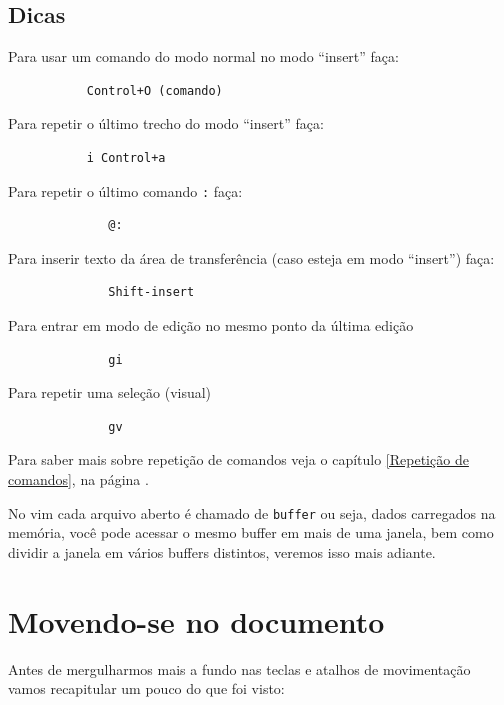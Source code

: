 \documentclass[10pt,a4paper,openany]{book}
\begin{document}
\section{Dicas}
\label{Dicas}
Para usar um comando do modo normal no modo ``insert'' faça:

\begin{verbatim}
		   Control+O (comando)
\end{verbatim}

Para repetir o último trecho do modo ``insert'' faça:

\begin{verbatim}
		   i Control+a
\end{verbatim}

Para repetir o último comando \verb+:+ faça:

\begin{verbatim}
			  @:
\end{verbatim}

Para inserir texto da área de transferência (caso esteja em modo ``insert'') faça:

\begin{verbatim}
			  Shift-insert
\end{verbatim}

Para entrar em modo de edição no mesmo ponto da última edição

\begin{verbatim}
			  gi
\end{verbatim}

Para repetir uma seleção (visual)

\begin{verbatim}
			  gv
\end{verbatim}

Para saber mais sobre repetição de comandos veja o capítulo \ref{Repetição de comandos},
na página \pageref{Repetição de comandos}.

No vim cada arquivo aberto é chamado de \verb|buffer| ou seja, dados
carregados na memória, você pode acessar o mesmo buffer em mais de uma
janela, bem como dividir a janela em vários buffers distintos, veremos
isso mais adiante.

\chapter{Movendo-se no documento}\label{cha:Movendo-se no documento}

Antes de mergulharmos mais a fundo nas teclas e atalhos de
movimentação vamos recapitular um pouco do que foi visto: \\
\end{document}
